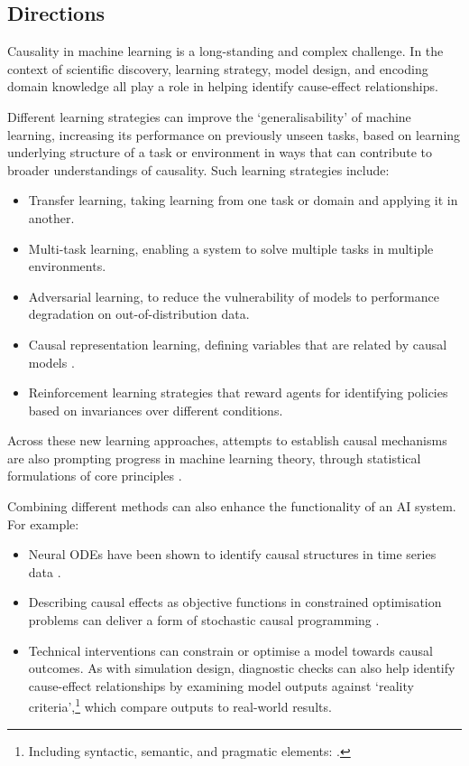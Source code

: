 \subsection{Directions}\label{directions-1}

Causality in machine learning is a long-standing and complex challenge.
In the context of scientific discovery, learning strategy, model design,
and encoding domain knowledge all play a role in helping identify
cause-effect relationships.

Different learning strategies can improve the `generalisability' of
machine learning, increasing its performance on previously unseen tasks,
based on learning underlying structure of a task or environment in ways
that can contribute to broader understandings of causality. Such
learning strategies include:

\begin{itemize}
\item
  Transfer learning, taking learning from one task or domain and
  applying it in another.
\item
  Multi-task learning, enabling a system to solve multiple tasks in
  multiple environments.
\item
  Adversarial learning, to reduce the vulnerability of models to
  performance degradation on out-of-distribution data.
\item
  Causal representation learning, defining variables that are related by
  causal models \citep{Scholkopf-causality22}.
\item
  Reinforcement learning strategies that reward agents for identifying
  policies based on invariances over different conditions.
\end{itemize}

Across these new learning approaches, attempts to establish causal
mechanisms are also prompting progress in machine learning theory,
through statistical formulations of core principles \citep{Guo-causal22}.

Combining different methods can also enhance the functionality of an AI
system. For example:

\begin{itemize}
\item
  Neural ODEs have been shown to identify causal structures in time
  series data \citep{Aliee-beyond21}.
\item
  Describing causal effects as objective functions in constrained
  optimisation problems can deliver a form of stochastic causal
  programming \citep{Padh-stochastic22}.
\item
  Technical interventions \citep{Jakobsen-distributional22}
  can constrain or optimise a model towards causal outcomes. As with
  simulation design, diagnostic checks can also help identify
  cause-effect relationships by examining model outputs against `reality
  criteria',\footnote{Including syntactic, semantic, and pragmatic
    elements: \citep{Stadler-wirklichkeitskriterien90}.} which compare outputs to
  real-world results.
\end{itemize}

